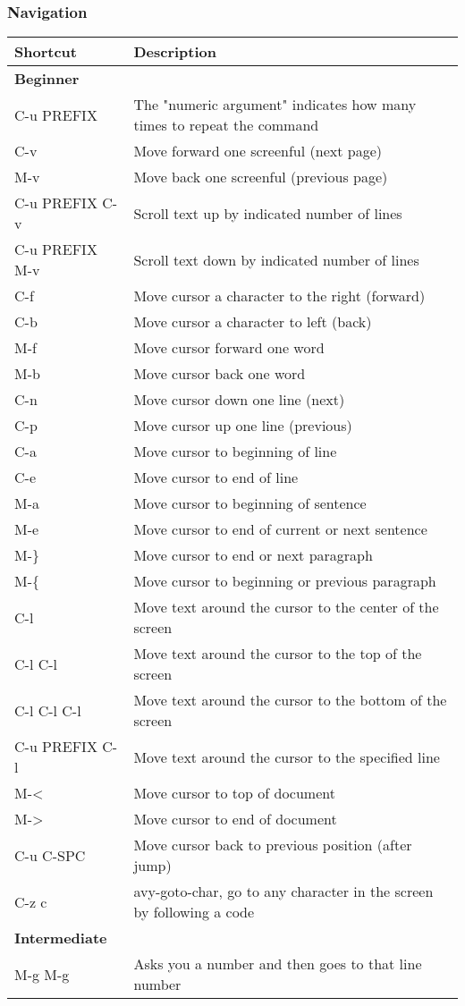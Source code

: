 \documentclass[11pt]{article}
\begin{document}
\subsubsection{Navigation}
\label{sec:org97ebf78}
\begin{center}
\begin{tabular}{ll}
\hline
Shortcut & Description\\
\hline
\textbf{Beginner} & \\
\hline
C-u PREFIX & The "numeric argument" indicates how many times to repeat the command\\
C-v & Move forward one screenful (next page)\\
M-v & Move back one screenful (previous page)\\
C-u PREFIX C-v & Scroll text up by indicated number of lines\\
C-u PREFIX M-v & Scroll text down by indicated number of lines\\
C-f & Move cursor a character to the right (forward)\\
C-b & Move cursor a character to left (back)\\
M-f & Move cursor forward one word\\
M-b & Move cursor back one word\\
C-n & Move cursor down one line (next)\\
C-p & Move cursor up one line (previous)\\
C-a & Move cursor to beginning of line\\
C-e & Move cursor to end of line\\
M-a & Move cursor to beginning of sentence\\
M-e & Move cursor to end of current or next sentence\\
M-\} & Move cursor to end or next paragraph\\
M-\{ & Move cursor to beginning or previous paragraph\\
C-l & Move text around the cursor to the center of the screen\\
C-l C-l & Move text around the cursor to the top of the screen\\
C-l C-l C-l & Move text around the cursor to the bottom of the screen\\
C-u PREFIX C-l & Move text around the cursor to the specified line\\
M-< & Move cursor to top of document\\
M-> & Move cursor to end of document\\
C-u C-SPC & Move cursor back to previous position (after jump)\\
C-z c & avy-goto-char, go to any character in the screen by following a code\\
\hline
\textbf{Intermediate} & \\
\hline
M-g M-g & Asks you a number and then goes to that line number\\
\hline
\end{tabular}
\end{center}
\end{document}
